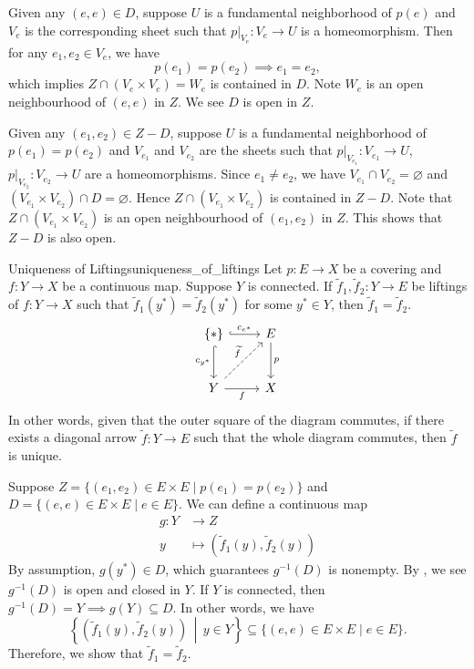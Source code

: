 \documentclass{report}
\newcommand{\midv}{\,\middle\vert\,}
\begin{document}
\begin{prf}
	Given any $(e,e)\in D$, suppose $U$ is a fundamental neighborhood of $p(e)$ and $V_e$ is the corresponding sheet such that $\left.p\right|_{V_e}:V_e\to U$ is a homeomorphism. Then for any $e_1,e_2\in V_e$, we have
	\[
		p(e_1)=p(e_2)\implies e_1=e_2,
	\]
	which implies $Z \cap\left(V_e \times V_e\right)=W_e$ is contained in $D$. Note $W_e$ is an open neighbourhood of $(e, e)$ in $Z$. We see $D$ is open in $Z$.

	Given any $(e_1,e_2)\in Z-D$, suppose $U$ is a fundamental neighborhood of $p(e_1)=p(e_2)$ and $V_{e_1}$ and $V_{e_2}$ are the sheets such that $\left.p\right|_{V_{e_1}}:V_{e_1}\to U$, $\left.p\right|_{V_{e_2}}:V_{e_2}\to U$ are a homeomorphisms. Since $e_1 \ne e_2$, we have $V_{e_1} \cap V_{e_2}=\varnothing$ and $\left(V_{e_1}\times V_{e_2}\right)\cap D=\varnothing$. Hence $Z \cap\left(V_{e_1} \times V_{e_2} \right)$  is contained in $Z-D$. Note that $Z \cap\left(V_{e_1} \times V_{e_2} \right)$ is an open neighbourhood of $(e_1,e_2)$ in $Z$. This shows that $Z- D$ is also open.
\end{prf}


\begin{proposition}{Uniqueness of Liftings}{uniqueness_of_liftings}
	Let $p: E \rightarrow X$ be a covering and $f: Y \rightarrow X$ be a continuous map. Suppose $Y$ is connected. If $\widetilde{f}_1, \widetilde{f}_2: Y \rightarrow E$ be liftings of $f: Y \rightarrow X$ such that $\widetilde{f}_1(y^*)=\widetilde{f}_2(y^*)$ for some $y^*\in Y$, then $\widetilde{f}_1=\widetilde{f}_2$.
	\[
		\begin{tikzcd}[ampersand replacement=\&]
			\{*\} \arrow[r, "c_{e^*}", hook] \arrow[d, "c_{y^*}"', hook]                      \& E \arrow[d, "p"] \\ [+8pt]
			Y \arrow[r, "f"'] \arrow[ru, "\widetilde{f}", dashed] \& X
		\end{tikzcd}
	\]
	In other words, given that the outer square of the diagram commutes, if there exists a diagonal arrow $\widetilde{f}:Y\to E$ such that the whole diagram commutes, then $\widetilde{f}$ is unique.
\end{proposition}

\begin{prf}
	Suppose $Z=\{(e_1, e_2) \in E \times E \mid p(e_1)=p(e_2)\}$ and $D=\{(e, e) \in E \times E \mid e\in E\}$. We can define a continuous map
	\begin{align*}
		g: Y & \longrightarrow Z                                               \\
		y    & \longmapsto \left(\widetilde{f}_1(y), \widetilde{f}_2(y)\right)
	\end{align*}
	By assumption, $g(y^*)\in D$, which guarantees $g^{-1}(D)$ is nonempty. By , we see $g^{-1}(D)$ is open and closed in $Y$. If $Y$ is connected, then $g^{-1}(D)=Y\implies g(Y)\subseteq D$. In other words, we have
	\[
		\left\{\left(\widetilde{f}_1(y), \widetilde{f}_2(y)\right) \midv y \in Y\right\} \subseteq\{(e, e) \in E \times E \mid e\in E\}.
	\]
	Therefore, we show that	$\widetilde{f}_1=\widetilde{f}_2$.
\end{prf}
\end{document}
